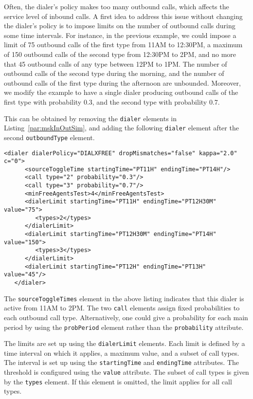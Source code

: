 Often, the dialer's policy makes too many outbound calls, which
affects the service level of inbound calls.
A first idea to address this issue without changing the dialer's
policy is to impose limits on the number of outbound calls during some
time intervals.
For instance, in the previous example, we could impose a limit of 75
outbound calls of the first type from 11AM to 12:30PM,
a maximum of 150 outbound calls of the second type from 12:30PM to 2PM,
and no more that 45 outbound calls of any type between 12PM to 1PM.
The number of outbound calls of the second type during the morning,
and the number of outbound calls of the first type during the
afternoon
are unbounded.
Moreover,
we modify the example to have a single dialer producing outbound calls
of the first type with probability 0.3, and the second type with
probability 0.7.

This can be obtained by removing the \texttt{dialer} elements
in Listing~\ref{par:mskInOutSim}, and adding the following
\texttt{dialer} element after the second \texttt{outbound\-Type}
element.
\begin{lstlisting}[caption={Dialer producing two call types, and using
    limits},
 label=par:mskInOutSimLim]
   <dialer dialerPolicy="DIALXFREE" dropMismatches="false" kappa="2.0" c="0">
      <sourceToggleTime startingTime="PT11H" endingTime="PT14H"/>
      <call type="2" probability="0.3"/>
      <call type="3" probability="0.7"/>
      <minFreeAgentsTest>4</minFreeAgentsTest>
      <dialerLimit startingTime="PT11H" endingTime="PT12H30M" value="75">
         <types>2</types>
      </dialerLimit>
      <dialerLimit startingTime="PT12H30M" endingTime="PT14H" value="150">
         <types>3</types>
      </dialerLimit>
      <dialerLimit startingTime="PT12H" endingTime="PT13H" value="45"/>
   </dialer>
\end{lstlisting}
The \texttt{source\-Toggle\-Times} element
in the above listing indicates that this dialer
is
active from 11AM to 2PM.
The two \texttt{call} elements assign fixed probabilities to each
outbound call type.
Alternatively, one could give a probability for each main period by
using the \texttt{prob\-Period} element rather than the
\texttt{probability}
attribute.

The limits are set up using the \texttt{dialer\-Limit} elements.
Each limit is defined by a time interval on which it applies, a
maximum value, and a subset of call types.
The interval is set up using the \texttt{starting\-Time} and
\texttt{ending\-Time} attributes.
The threshold is configured using the \texttt{value} attribute.
The subset of call types is given by the \texttt{types} element.
If this element is omitted, the limit applies for all call types.

